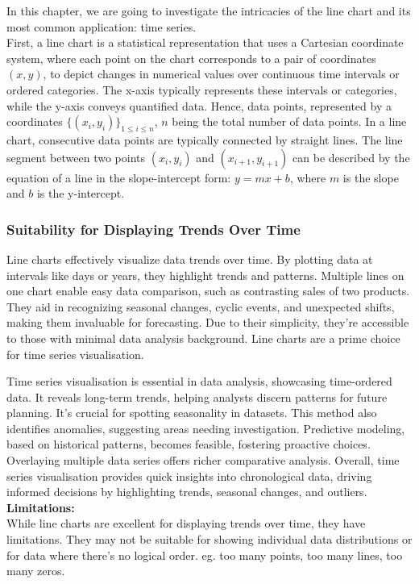 \documentclass{article}\usepackage[]{graphicx}\usepackage[]{xcolor}
\begin{document}
In this chapter, we are going to investigate the intricacies of the line chart and its most common application: time series.\\
First, a line chart is a statistical representation that uses a Cartesian coordinate system, where each point on the chart corresponds to a pair of coordinates $(x,y)$, to depict changes in numerical values over continuous time intervals or ordered categories. The x-axis typically represents these intervals or categories, while the y-axis conveys quantified data. Hence, data points, represented by a coordinates $\{(x_i,y_i)\}_{1 \leq i \leq n}$, $n$ being the total number of data points. In a line chart, consecutive data points are typically connected by straight lines. The line segment between two points $(x_i,y_i)$ and $(x_{i+1},y_{i+1})$ can be described by the equation of a line in the slope-intercept form: $y=mx+b$, where $m$ is the slope and $b$ is the y-intercept.

\subsubsection{Suitability for Displaying Trends Over Time}
Line charts effectively visualize data trends over time. By plotting data at intervals like days or years, they highlight trends and patterns. Multiple lines on one chart enable easy data comparison, such as contrasting sales of two products. They aid in recognizing seasonal changes, cyclic events, and unexpected shifts, making them invaluable for forecasting. Due to their simplicity, they're accessible to those with minimal data analysis background. Line charts are a prime choice for time series visualisation.

Time series visualisation is essential in data analysis, showcasing time-ordered data. It reveals long-term trends, helping analysts discern patterns for future planning. It's crucial for spotting seasonality in datasets. This method also identifies anomalies, suggesting areas needing investigation. Predictive modeling, based on historical patterns, becomes feasible, fostering proactive choices. Overlaying multiple data series offers richer comparative analysis. Overall, time series visualisation provides quick insights into chronological data, driving informed decisions by highlighting trends, seasonal changes, and outliers.\\
\noindent
\textbf{Limitations:}\\
While line charts are excellent for displaying trends over time, they have limitations. They may not be suitable for showing individual data distributions or for data where there's no logical order. eg. too many points, too many lines, too many zeros.
\end{document}
